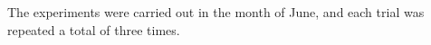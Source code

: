The experiments were carried out in the month of June, and each trial was repeated a total of three times.
